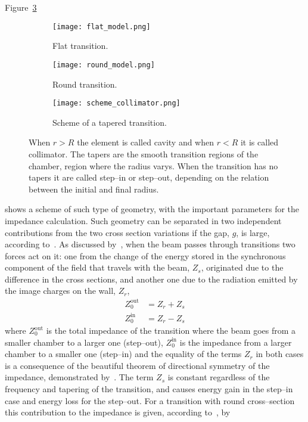     Figure~\ref{fig:collimator_geometry}
    \begin{figure}
        \centering
        \begin{subfigure}[b]{0.24\textwidth}
            \centering
            \texttt{[image: flat\_model.png]}
            \caption{Flat transition.}
            \label{fig:flat_transition}
        \end{subfigure}
        \begin{subfigure}[b]{0.24\textwidth}
            \centering
            \texttt{[image: round\_model.png]}
            \caption{Round transition.}
            \label{fig:round_transition}
        \end{subfigure}
        \begin{subfigure}[b]{0.5\textwidth}
            \centering
            \texttt{[image: scheme\_collimator.png]}
            \caption{Scheme of a tapered transition.}
            \label{fig:collimator_geometry}
        \end{subfigure}
        \caption[Scheme of a tapered transition.]{When $r>R$ the element is called cavity and when $r<R$ it is called collimator. The tapers are the smooth transition regions of the chamber, region where the radius varys. When the transition has no tapers it are called step--in or step--out, depending on the relation between the initial and final radius.}
        \label{fig:collimator_geometry_types}
    \end{figure}
    shows a scheme of such type of geometry, with the important parameters for the impedance calculation. Such geometry can be separated in two independent contributions from the two cross section variations if the gap, $g$, is large, according to~. As discussed by~, when the beam passes through transitions two forces act on it: one from the change of the energy stored in the synchronous component of the field that travels with the beam, $Z_s$, originated due to the difference in the cross sections, and another one due to the radiation emitted by the image charges on the wall, $Z_r$,
    \begin{subequations}
        \begin{align}
            Z_0^\text{out} &= Z_r + Z_s\\
            Z_0^\text{in}  &= Z_r - Z_s
        \end{align}
    \end{subequations}
    where $Z_0^\text{out}$ is the total impedance of the transition where the beam goes from a smaller chamber to a larger one (step--out), $Z_0^\text{in}$ is the impedance from a larger chamber to a smaller one (step--in) and the equality of the terms $Z_r$ in both cases is a consequence of the beautiful theorem of directional symmetry of the impedance, demonstrated by~. The term $Z_s$ is constant regardless of the frequency and tapering of the transition, and causes energy gain in the step--in case and energy loss for the step--out. For a transition with round cross--section this contribution to the impedance is given, according to~, by
